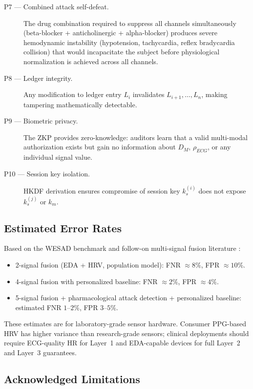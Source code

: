 \documentclass[12pt,a4paper]{article}
\begin{document}
\begin{description}
  \item[P7 — Combined attack self-defeat.] The drug combination required to
  suppress all channels simultaneously (beta-blocker + anticholinergic +
  alpha-blocker) produces severe hemodynamic instability (hypotension,
  tachycardia, reflex bradycardia collision) that would incapacitate the
  subject before physiological normalization is achieved across all channels.

  \item[P8 — Ledger integrity.] Any modification to ledger entry $L_i$
  invalidates $L_{i+1}, \ldots, L_n$, making tampering mathematically
  detectable.

  \item[P9 — Biometric privacy.] The ZKP provides zero-knowledge: auditors
  learn that a valid multi-modal authorization exists but gain no information
  about $D_M$, $\rho_{ECG}$, or any individual signal value.

  \item[P10 — Session key isolation.] HKDF derivation ensures compromise of
  session key $k_s^{(i)}$ does not expose $k_s^{(j)}$ or $k_m$.
\end{description}

\subsection{Estimated Error Rates}

Based on the WESAD benchmark \cite{schmidt2018wesad} and follow-on multi-signal
fusion literature \cite{healey2005stress, gjoreski2017stress}:

\begin{itemize}
  \item 2-signal fusion (EDA + HRV, population model): FNR $\approx 8\%$, FPR
  $\approx 10\%$.
  \item 4-signal fusion with personalized baseline: FNR $\approx 2\%$, FPR
  $\approx 4\%$.
  \item 5-signal fusion + pharmacological attack detection + personalized
  baseline: estimated FNR $1\text{--}2\%$, FPR $3\text{--}5\%$.
\end{itemize}

These estimates are for laboratory-grade sensor hardware. Consumer PPG-based
HRV has higher variance than research-grade sensors; clinical deployments
should require ECG-quality HR for Layer~1 and EDA-capable devices for
full Layer~2 and Layer~3 guarantees.

\subsection{Acknowledged Limitations}
\end{document}
